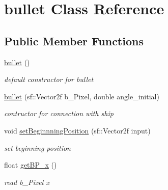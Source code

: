 \hypertarget{classbullet}{}\section{bullet Class Reference}
\label{classbullet}
\subsection*{Public Member Functions}
\begin{DoxyCompactItemize}
\item 
\mbox{\label{classbullet_a56eac386b0e6268b746bd7ed4883e1df}} 
\mbox{\hyperlink{classbullet_a56eac386b0e6268b746bd7ed4883e1df}{bullet}} ()
\begin{DoxyCompactList}\small\item\em default constructor for bullet \end{DoxyCompactList}\item 
\mbox{\label{classbullet_a37db2378e8858134f50ae47f804f575d}} 
\mbox{\hyperlink{classbullet_a37db2378e8858134f50ae47f804f575d}{bullet}} (sf\+::\+Vector2f b\+\_\+\+Pixel, double angle\+\_\+initial)
\begin{DoxyCompactList}\small\item\em contructor for connection with ship \end{DoxyCompactList}\item 
\mbox{\label{classbullet_a3e06b1df97a6ee4fa0e455cb892111c5}} 
void \mbox{\hyperlink{classbullet_a3e06b1df97a6ee4fa0e455cb892111c5}{set\+Beginnning\+Position}} (sf\+::\+Vector2f input)
\begin{DoxyCompactList}\small\item\em set beginning position \end{DoxyCompactList}\item 
\mbox{\label{classbullet_aa1c74c7979543685bd8e2e58fa92d931}} 
float \mbox{\hyperlink{classbullet_aa1c74c7979543685bd8e2e58fa92d931}{get\+B\+P\+\_\+x}} ()
\begin{DoxyCompactList}\small\item\em read b\+\_\+\+Pixel x \end{DoxyCompactList}\item 
\mbox{\label{classbullet_a4570072fe279fcf9eb036ff26b513676}} 

\end{DoxyCompactItemize}
